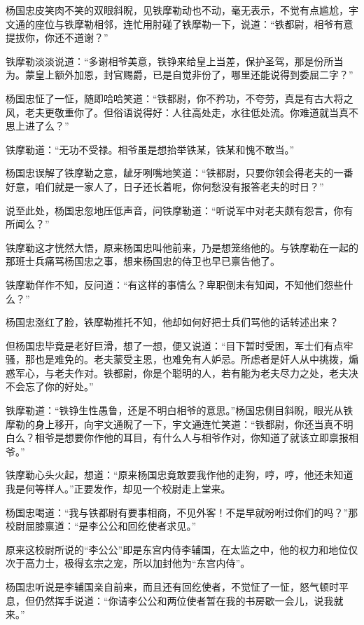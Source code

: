 \documentclass[12pt,oneside]{book}
\begin{document}
杨国忠皮笑肉不笑的双眼斜睨，见铁摩勒动也不动，毫无表示，不觉有点尴尬，宇文通的座位与铁摩勒相邻，连忙用肘碰了铁摩勒一下，说道：``铁都尉，相爷有意提拔你，你还不道谢？''

铁摩勒淡淡说道：``多谢相爷美意，铁铮来给皇上当差，保护圣驾，那是份所当为。蒙皇上额外加恩，封官赐爵，已是自觉非份了，哪里还能说得到委屈二字？''

杨国忠怔了一怔，随即哈哈笑道：``铁都尉，你不矜功，不夸劳，真是有古大将之风，老夫更敬重你了。但俗语说得好：人往高处走，水往低处流。你难道就当真不思上进了么？''

铁摩勒道：``无功不受禄。相爷虽是想抬举铁某，铁某和愧不敢当。''

杨国忠误解了铁摩勒之意，龇牙咧嘴地笑道：``铁都尉，只要你领会得老夫的一番好意，咱们就是一家人了，日子还长着呢，你何愁没有报答老夫的时日？''

说至此处，杨国忠忽地压低声音，问铁摩勒道：``听说军中对老夫颇有怨言，你有所闻么？''

铁摩勒这才恍然大悟，原来杨国忠叫他前来，乃是想笼络他的。与铁摩勒在一起的那班士兵痛骂杨国忠之事，想来杨国忠的侍卫也早已禀告他了。

铁摩勒佯作不知，反问道：``有这样的事情么？卑职倒未有知闻，不知他们怨些什么？''

杨国忠涨红了脸，铁摩勒推托不知，他却如何好把士兵们骂他的话转述出来？

但杨国忠毕竟是老好巨滑，想了一想，便又说道：``目下暂时受困，军士们有点牢骚，那也是难免的。老夫蒙受主恩，也难免有人妒忌。所虑者是奸人从中挑拨，煽惑军心，与老夫作对。铁都尉，你是个聪明的人，若有能为老夫尽力之处，老夫决不会忘了你的好处。''

铁摩勒道：``铁铮生性愚鲁，还是不明白相爷的意思。''杨国忠侧目斜睨，眼光从铁摩勒的身上移开，向宇文通睨了一下，宇文通连忙笑道：``铁都尉，你还当真不明白么？相爷是想要你作他的耳目，有什么人与相爷作对，你知道了就该立即禀报相爷。''

铁摩勒心头火起，想道：``原来杨国忠竟敢要我作他的走狗，哼，哼，他还未知道我是何等样人。''正要发作，却见一个校尉走上堂来。

杨国忠喝道：``我与铁都尉有要事相商，不见外客！不是早就吩咐过你们的吗？''那校尉屈膝禀道：``是李公公和回纥使者求见。''

原来这校尉所说的``李公公''即是东宫内侍李辅国，在太监之中，他的权力和地位仅次于高力士，极得玄宗之宠，所以加封他为``东宫内侍''。

杨国忠听说是李辅国亲自前来，而且还有回纥使者，不觉怔了一怔，怒气顿时平息，但仍然挥手说道：``你请李公公和两位使者暂在我的书房歇一会儿，说我就来。''
\end{document}
